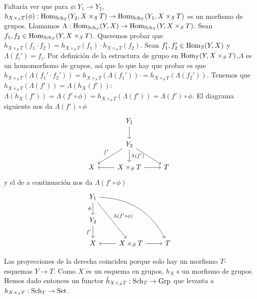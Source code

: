 \documentclass[GA.tex]{subfiles}
\begin{document}
Faltaría ver que para $\phi:Y_1\to Y_2$, $h_{X\times_S T}(\phi):\operatorname{Hom}_{\operatorname{Sch}_T}(Y_2,X\times_S T)\to\operatorname{Hom}_{\operatorname{Sch}_T}(Y_1,X\times_S T)$ es un morfismo de grupos. 
Llamamos $\Lambda:\operatorname{Hom}_{\operatorname{Sch}_S}(Y,X)\to\operatorname{Hom}_{\operatorname{Sch}_T}(Y,X\times_S T)$. Sean $f_1,f_2\in\operatorname{Hom}_{\operatorname{Sch}_T}(Y,X\times_S T)$. Queremos probar que $h_{X\times_S T}(f_1\cdot f_2)=h_{X\times_S T}(f_1)\cdot h_{X\times_S T}(f_2)$. Sean $f_1',f_2'\in\operatorname{Hom}_S(Y,X)$ y $\Lambda(f_i')=f_i$. Por definición de la estructura de grupo en $\operatorname{Hom}_T(Y,X\times_S T)$,$\Lambda$ es un homomorfismo de grupos, así que lo que hay que probar es que $h_{X\times_S T}(\Lambda(f_1'\cdot f_2'))=h_{X\times_S T}(\Lambda(f_1'))\cdot=h_{X\times_S T}(\Lambda(f_2'))$. Tenemos que $h_{X\times_S T}(\Lambda(f'))=\Lambda(h_X(f'))$: $\Lambda(h_X(f'))=\Lambda(f'\circ\phi)=h_{X\times_S T}(\Lambda(f'))=\Lambda(f')\circ\phi$. El diagrama siguiente nos da $\Lambda(f')\circ\phi$
\[
\begin{tikzcd}
 & Y_1 \arrow[d] &  \\
 & Y_2 \arrow[ld, "f'"'] \arrow[rd] \arrow[d, "\Lambda(f')"] &  \\
X & X\times_ST \arrow[l] \arrow[r] & T
\end{tikzcd}
\]
y el de a continuación nos da $\Lambda(f'\circ\phi)$
\[
\begin{tikzcd}
Y_1 \arrow[d, "\phi"'] \arrow[rdd, "\Lambda(f'\circ\phi)"] \arrow[rrdd, bend left] &  &  \\
Y_2 \arrow[d, "f'"'] &  &  \\
X & X\times_S T \arrow[l] \arrow[r] & T
\end{tikzcd}
\]

Las proyecciones de la derecha coinciden porque solo hay un morfismo $T$-esquemas $Y\to T$. Como $X$ es un esquema en grupos, $h_X$ s un morfismo de grupos. Hemos dado entonces un functor $\tilde{h}_{X\times_S T}:\operatorname{Sch}_T\to\operatorname{Grp}$ que levanta a $h_{X\times_S T}:\operatorname{Sch}_T\to\operatorname{Set}$. 
\end{document}
